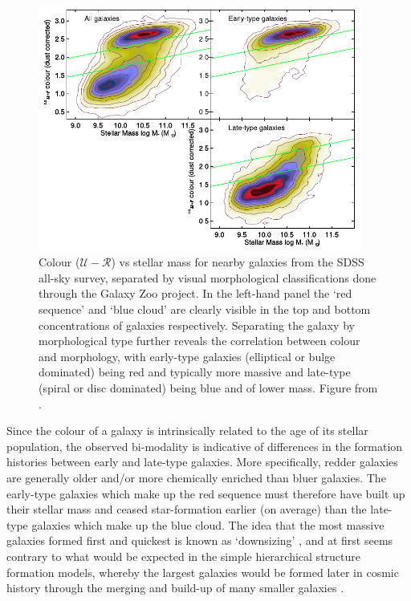 \begin{figure}
\centering
	  \includegraphics[width=0.95\textwidth]{ColourMass_Schawinski.pdf}
	  \caption[Colour ($\mathcal{U} - \mathcal{R}$) vs stellar mass for nearby galaxies from the SDSS all-sky survey, separated by visual morphological classifications done through the Galaxy Zoo project.]{Colour ($\mathcal{U} - \mathcal{R}$) vs stellar mass for nearby galaxies from the SDSS all-sky survey, separated by visual morphological classifications done through the Galaxy Zoo project. In the left-hand panel the `red sequence' and `blue cloud' are clearly visible in the top and bottom concentrations of galaxies respectively. Separating the galaxy by morphological type further reveals the correlation between colour and morphology, with early-type galaxies (elliptical or bulge dominated) being red and typically more massive and late-type (spiral or disc dominated) being blue and of lower mass. Figure from \citet{Schawinski:2014ep}.}
	  \label{fig:colour_mass}
\end{figure}

Since the colour of a galaxy is intrinsically related to the age of its stellar population, the observed bi-modality is indicative of differences in the formation histories between early and late-type galaxies. More specifically, redder galaxies are generally older and/or more chemically enriched than bluer galaxies. The early-type galaxies which make up the red sequence must therefore have built up their stellar mass and ceased star-formation earlier (on average) than the late-type galaxies which make up the blue cloud. The idea that the most massive galaxies formed first and quickest is known as `downsizing' \citep{Cowie:1996fb}, and at first seems contrary to what would be expected in the simple hierarchical structure formation models, whereby the largest galaxies would be formed later in cosmic history through the merging and build-up of many smaller galaxies \citep{DeLucia:2006gl}.

